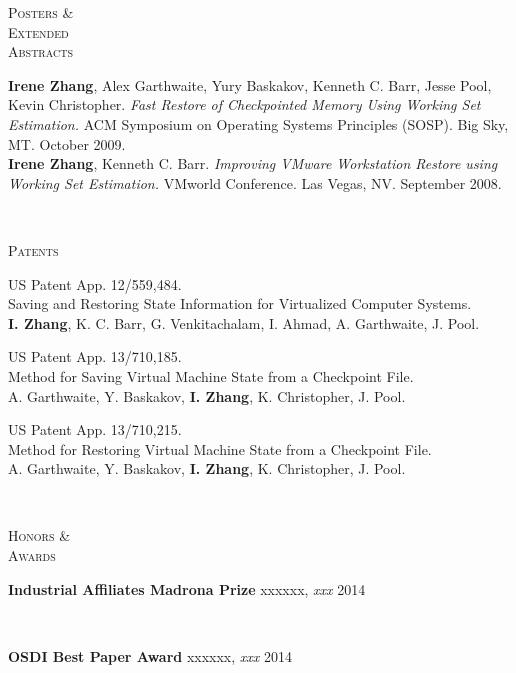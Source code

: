 \documentclass[10pt,times]{report}
\newlength{\sectiongap}
\newlength{\entrygap}
\newlength{\sectioncolwidth}
\newlength{\colgap}
\newlength{\stuffwidth}
\def\ifEqString#1#2{\def\testa{#1}\def\testb{#2}%
  \ifx\testa\testb}
\newenvironment{rtable}{
  \begin{minipage}{\textwidth}
  }{
  \end{minipage}
}
\newenvironment{rentry}[3][xxx]{
  \begin{minipage}[t]{\hsize}
    \textbf{#2}\ifEqString{#1}{xxx}\relax\else, \textit{#1}\fi
    \hspace{\stretch{1}} #3 \\
  }{
    \removelastskip
  \end{minipage}
  \\[\entrygap]  %
}
\newenvironment{rsection}[1]{
  \begin{minipage}[t]{\sectioncolwidth}
    \textsc{#1}
  \end{minipage}
  \hspace{\colgap}
  \begin{minipage}[t]{\stuffwidth}
  }{
    \removelastskip
  \end{minipage}
  \\[\sectiongap]
}
\begin{document}
\begin{rtable}
\begin{rsection}{Posters \&\\Extended\\Abstracts}
    \textbf{Irene Zhang}, Alex Garthwaite, Yury Baskakov, Kenneth
    C. Barr, Jesse Pool, Kevin Christopher. \textit{Fast Restore of
      Checkpointed Memory Using Working Set Estimation.} ACM Symposium
    on Operating Systems Principles (SOSP).  Big Sky, MT. October
    2009.\\

    \textbf{Irene Zhang}, Kenneth C. Barr.  \textit{Improving VMware
      Workstation Restore using Working Set Estimation.}  VMworld
    Conference. Las Vegas, NV. September 2008.
  \end{rsection}



\end{rtable}

\begin{rtable}
  \begin{rsection}{Patents}
    US Patent App. 12/559,484.\\
    Saving and Restoring State Information for Virtualized Computer Systems.\\
    \textbf{I. Zhang}, K. C. Barr, G. Venkitachalam, I. Ahmad, A. Garthwaite, J. Pool.\\\vspace{-0.5em}

    US Patent App. 13/710,185.\\
    Method for Saving Virtual Machine State from a Checkpoint
    File.\\
    A. Garthwaite, Y. Baskakov, \textbf{I. Zhang}, K. Christopher,
    J. Pool.\\\vspace{-0.5em}

    US Patent App. 13/710,215.\\
    Method for Restoring Virtual Machine State from a Checkpoint
    File.\\
    A. Garthwaite, Y. Baskakov, \textbf{I. Zhang}, K. Christopher,
    J. Pool.\\
  \end{rsection}

  \begin{rsection}{Honors \&\\Awards}
    \begin{rentry}{Industrial Affiliates Madrona Prize}{2014}
    \end{rentry} \vspace{-0.5em}

    \begin{rentry}{OSDI Best Paper Award}{2014}
    \end{rentry} \vspace{-0.5em}


\end{rsection}
\end{rtable}
\end{document}
